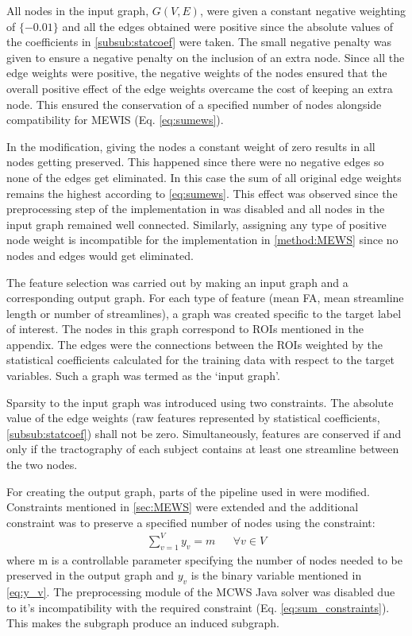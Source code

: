 \documentclass[msthesis.tex]{subfiles}
\begin{document}
All nodes in the input graph, $G(V,E)$, were given a constant negative weighting of $\{-0.01\}$ and all the edges obtained were positive since the absolute values of the coefficients in \autoref{subsub:statcoef} were taken. The small negative penalty was given to ensure a negative penalty on the inclusion of an extra node. Since all the edge weights were positive, the negative weights of the nodes ensured that the overall positive effect of the edge weights overcame the cost of keeping an extra node. This ensured the conservation of a specified number of nodes alongside compatibility for \gls{MEWIS}  (Eq. \ref{eq:sumews}). 

In the modification, giving the nodes a constant weight of zero results in all nodes getting preserved. This happened since there were no negative edges so none of the edges get eliminated. In this case the sum of all original edge weights remains the highest according to \cref{eq:sumews}. This effect was observed since the preprocessing step of the implementation in \cite{DBLP:journals/corr/LobodaAS16} was disabled and all nodes in the input graph remained well connected. Similarly, assigning any type of positive node weight is incompatible for the implementation in \autoref{method:MEWS} since no nodes and edges would get eliminated. 

The feature selection was carried out by making an input graph and a corresponding output graph. For each type of feature (mean FA, mean streamline length or number of streamlines), a graph was created specific to the target label of interest. The nodes in this graph correspond to ROIs mentioned in the appendix. The edges were the connections between the ROIs weighted by the statistical coefficients calculated for the training data with respect to the target variables. Such a graph was termed as the `input graph'. 

Sparsity to the input graph was introduced using two constraints. The absolute value of the edge weights (raw features represented by statistical coefficients, \autoref{subsub:statcoef}) shall not be zero. Simultaneously, features are conserved if and only if the tractography of each subject contains at least one streamline between the two nodes. 

For creating the output graph, parts of the pipeline used in \cite{DBLP:journals/corr/LobodaAS16} were modified. Constraints mentioned in \autoref{sec:MEWS} were extended and the additional constraint was to preserve a specified number of nodes using the constraint:
\begin{align}
    \label{eq:sum_constraints}
    \sum_{v=1}^{V} y_v = m        &&  \forall v \in V
\end{align}
where m is a controllable parameter specifying the number of nodes needed to be preserved in the output graph and $y_v$ is the binary variable mentioned in \autoref{eq:y_v}. The preprocessing module of the MCWS Java solver was disabled due to it's incompatibility with the required constraint (Eq. \ref{eq:sum_constraints}). This makes the subgraph produce an induced subgraph. 
\end{document}

